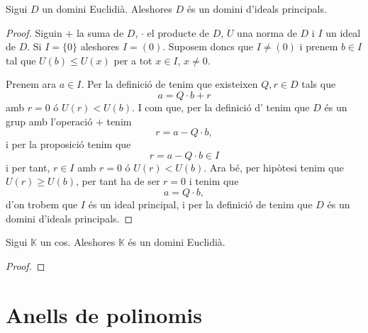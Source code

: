 \documentclass[../../Main.tex]{subfiles}
\begin{document}
	\begin{theorem}
		Sigui \(D\) un domini Euclidià. Aleshores \(D\) és un domini d'ideals principals.
		\begin{proof}
			Siguin \(+\) la suma de \(D\), \(\cdot\) el producte de \(D\), \(U\) una norma de \(D\) i \(I\) un ideal de \(D\). Si \(I=\{0\}\) aleshores \(I=(0)\). Suposem doncs que \(I\neq(0)\) i prenem \(b\in I\) tal que \(U(b)\leq U(x)\) per a tot \(x\in I\), \(x\neq0\).
			
			Prenem ara \(a\in I\). Per la definició de  tenim que existeixen \(Q,r\in D\) tals que
			\[a=Q\cdot b+r\]
			amb \(r=0\) ó \(U(r)<U(b)\). I com que, per la definició d' tenim que \(D\) és un grup amb l'operació \(+\) tenim
			\[r=a-Q\cdot b,\]
			i per la proposició  tenim que
			\[r=a-Q\cdot b\in I\]
			i per tant, \(r\in I\) amb \(r=0\) ó \(U(r)<U(b)\). Ara bé, per hipòtesi tenim que \(U(r)\geq U(b)\), per tant ha de ser \(r=0\) i tenim que
			\[a=Q\cdot b,\]
			d'on trobem que \(I\) és un ideal principal, i per la definició de  tenim que \(D\) és un domini d'ideals principals.
		\end{proof}
	\end{theorem}
	\begin{theorem}
		Sigui \(\mathbb{K}\) un cos. Aleshores \(\mathbb{K}\) és un domini Euclidià.
		\begin{proof}
		\end{proof}
	\end{theorem}
\section{Anells de polinomis}
\end{document}
